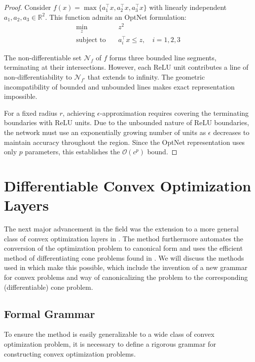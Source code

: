 \documentclass{article}
\begin{document}
\begin{proof}
Consider $f(x) = \max\{a_1^\top x, a_2^\top x, a_3^\top x\}$ with linearly independent $a_1,a_2,a_3 \in \mathbb{R}^2$. This function admits an OptNet formulation:
\begin{equation*}
\begin{aligned}
\min_{z} \quad & z^2 \\
\text{subject to} \quad & a_i^\top x \leq z, \quad i = 1, 2, 3
\end{aligned}
\end{equation*}

The non-differentiable set $\mathcal{N}_f$ of $f$ forms three bounded line segments, terminating at their intersections. However, each ReLU unit contributes a line of non-differentiability to $\mathcal{N}_{f'}$ that extends to infinity. The geometric incompatibility of bounded and unbounded lines makes exact representation impossible.

For a fixed radius $r$, achieving $\epsilon$-approximation requires covering the terminating boundaries with ReLU units. Due to the unbounded nature of ReLU boundaries, the network must use an exponentially growing number of units as $\epsilon$ decreases to maintain accuracy throughout the region. Since the OptNet representation uses only $p$ parameters, this establishes the $\mathcal{O}(c^p)$ bound.
\end{proof}

\section{Differentiable Convex Optimization Layers}

The next major advancement in the field was the extension to a more general class of convex optimization layers in \citet{differentiableconvexoptimizationlayers}. The method furthermore automates the conversion of the optimization problem to canonical form and uses the efficient method of differentiating cone problems found in \citet{conedifferentiation}. We will discuss the methods used in \citet{differentiableconvexoptimizationlayers} which make this possible, which include the invention of a new grammar for convex problems and way of canonicalizing the problem to the corresponding (differentiable) cone problem. 

\subsection{Formal Grammar}
To ensure the method is easily generalizable to a wide class of convex optimization problem, it is necessary to define a rigorous grammar for constructing convex optimization problems. 
\end{document}
